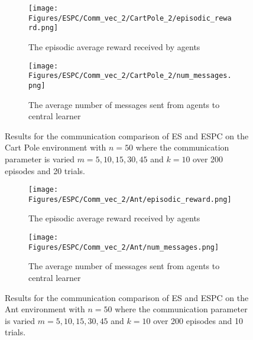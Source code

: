 \begin{figure}[H]
    \centering
    \begin{subfigure}{0.6\textwidth}
        \centering
        \texttt{[image: Figures/ESPC/Comm\_vec\_2/CartPole\_2/episodic\_reward.png]}
        \caption{The episodic average reward received by agents}
        \label{fig:CommEpisodicReward}
    \end{subfigure}
    \begin{subfigure}{0.6\textwidth}
        \centering
        \texttt{[image: Figures/ESPC/Comm\_vec\_2/CartPole\_2/num\_messages.png]}
        \caption{The average number of messages sent from agents to central learner}
        \label{fig:CommMessages}
    \end{subfigure}
    \caption{Results for the communication comparison of ES and ESPC on the Cart Pole environment with $n=50$ where the communication parameter is varied $m=5,10,15,30,45$ and $k=10$ over 200 episodes and 20 trials.}
    \label{fig:CPComm}
\end{figure}
\begin{figure}[H]
    \centering
    \begin{subfigure}{0.6\textwidth}
        \centering
        \texttt{[image: Figures/ESPC/Comm\_vec\_2/Ant/episodic\_reward.png]}
        \caption{The episodic average reward received by agents}
        \label{fig:AntCommEpisodicReward}
    \end{subfigure}
    \begin{subfigure}{0.6\textwidth}
        \centering
        \texttt{[image: Figures/ESPC/Comm\_vec\_2/Ant/num\_messages.png]}
        \caption{The average number of messages sent from agents to central learner}
        \label{fig:AntCommMessages}
    \end{subfigure}
    \caption{Results for the communication comparison of ES and ESPC on the Ant environment with $n=50$ where the communication parameter is varied $m=5,10,15,30,45$ and $k=10$ over 200 episodes and 10 trials.}
    \label{fig:AntComm}
\end{figure}



